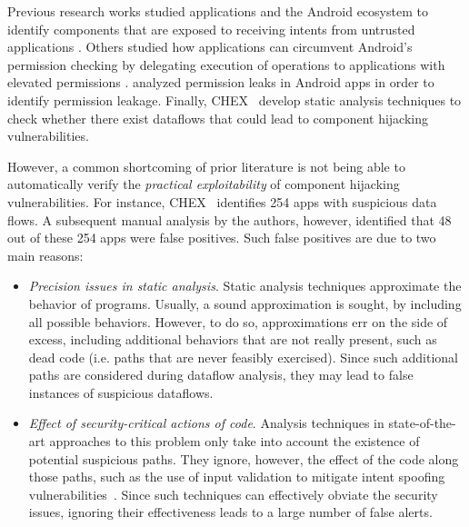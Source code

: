 
Previous research works studied applications and the Android ecosystem to
identify components that are exposed to receiving intents from untrusted
applications \cite{chin2011analyzing}. Others studied how applications can
circumvent Android's permission checking by delegating execution of operations
to applications with elevated permissions \cite{felt2011permission}. 
\cite{Grace:Android:2012} analyzed permission leaks in Android apps in order to identify permission leakage. 
Finally, CHEX~\cite{Lu:CHEX:2012} develop static analysis techniques to
check whether there exist dataflows that could lead to component hijacking vulnerabilities. 


However, a common shortcoming of prior literature is not being able to automatically verify 
the \emph{practical exploitability} of component hijacking vulnerabilities. For instance, 
CHEX~\cite{Lu:CHEX:2012} identifies 254 apps with suspicious data flows. A subsequent manual 
analysis by the authors, however, identified that 48 out of these 254 apps were false positives. 
Such false positives are due to two main reasons:
\begin{itemize}
\item {\em Precision issues in static analysis}. Static analysis techniques approximate the behavior of programs. Usually, a sound approximation is sought, by including all possible behaviors. However, to do so, approximations err on the side of excess, including additional behaviors that are not really present, such as dead code (i.e. paths that are never feasibly exercised). Since such additional paths are considered during dataflow analysis, they may lead to false instances of suspicious dataflows.  

\item {\em Effect of security-critical actions of code}. Analysis techniques in state-of-the-art approaches to this problem only take into account the existence of potential suspicious paths. They ignore, however, the effect of the code along those paths, such as the use of input validation to mitigate intent spoofing vulnerabilities~\cite{chin2011analyzing}. Since such techniques can effectively obviate the security issues, ignoring their effectiveness leads to a large number of false alerts.
\end{itemize}

